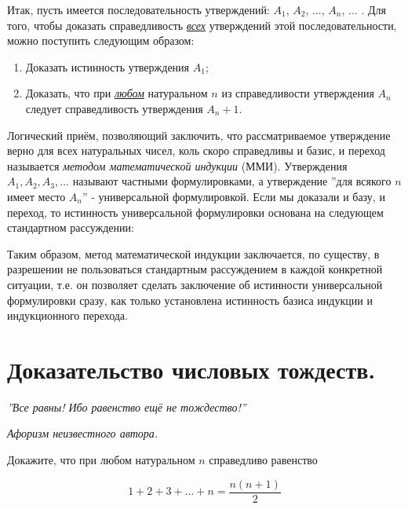 Итак, пусть имеется последовательность утверждений: $A_1$, $A_2$, $...$, $A_n$, $...$ . Для того, чтобы доказать
справедливость \textit{\underline{всех}} утверждений этой последовательности, можно поступить следующим образом:
\begin{enumerate}
\item Доказать истинность утверждения $A_1$;
\item Доказать, что при \textit{\underline{любом}} натуральном $n$ из справедливости утверждения $A_n$ следует справедливость
утверждения $A_n+1$. 
\end{enumerate}

Логический приём, позволяющий заключить, что рассматриваемое утверждение верно для всех натуральных чисел, коль скоро справедливы и базис, и переход называется \textit{методом математической индукции} (ММИ). Утверждения $A_1, A_2, A_3, ...$ называют частными формулировками, а утверждение ''для всякого $n$ имеет место $A_n$'' - универсальной формулировкой. Если мы доказали и базу, и переход, то истинность универсальной формулировки основана на следующем стандартном рассуждении:


Таким образом, метод математической индукции заключается, по существу, в разрешении не пользоваться стандартным рассуждением в каждой конкретной ситуации, т.е. он позволяет сделать заключение об истинности универсальной формулировки сразу, как только установлена истинность базиса индукции и индукционного перехода.

\section{Доказательство числовых тождеств.}
\epigraph{\textit{''Все равны! Ибо равенство ещё не тождество!''}}{\textit{Афоризм неизвестного автора.}}

\begin{thm}
    Докажите, что при любом натуральном $n$ справедливо равенство 

    $$1 + 2 + 3 + ... + n = \dfrac{n(n+1)}{2}$$
\end{thm}

